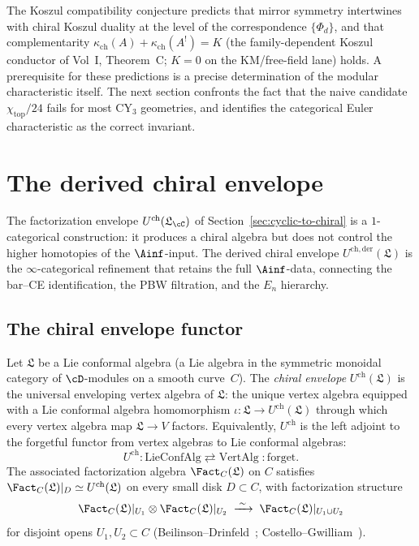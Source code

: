 The Koszul compatibility conjecture predicts that mirror symmetry intertwines with chiral Koszul duality at the level of the correspondence $\{\Phi_d\}$, and that complementarity $\kappa_{\mathrm{ch}}(A) + \kappa_{\mathrm{ch}}(A^!) = K$ (the family-dependent Koszul conductor of Vol~I, Theorem~C; $K = 0$ on the KM/free-field lane) holds. A prerequisite for these predictions is a precise determination of the modular characteristic itself. The next section confronts the fact that the naive candidate $\chi_{\mathrm{top}}/24$ fails for most CY$_3$ geometries, and identifies the categorical Euler characteristic as the correct invariant.

\section{The derived chiral envelope}
\label{sec:derived-chiral-envelope}

The factorization envelope $U^{\mathrm{ch}}(\mathfrak{L}_\cC)$ of Section~\ref{sec:cyclic-to-chiral} is a $1$-categorical construction: it produces a chiral algebra but does not control the higher homotopies of the $\Ainf$-input. The derived chiral envelope $U^{\mathrm{ch,der}}(\mathfrak{L})$ is the $\infty$-categorical refinement that retains the full $\Ainf$-data, connecting the bar--CE identification, the PBW filtration, and the $E_n$ hierarchy.

\subsection{The chiral envelope functor}
\label{subsec:chiral-envelope-functor}

\begin{construction}
\label{constr:chiral-envelope}
Let $\mathfrak{L}$ be a Lie conformal algebra (a Lie algebra in the symmetric monoidal category of $\cD$-modules on a smooth curve~$C$). The \emph{chiral envelope} $U^{\mathrm{ch}}(\mathfrak{L})$ is the universal enveloping vertex algebra of $\mathfrak{L}$: the unique vertex algebra equipped with a Lie conformal algebra homomorphism $\iota \colon \mathfrak{L} \to U^{\mathrm{ch}}(\mathfrak{L})$ through which every vertex algebra map $\mathfrak{L} \to V$ factors. Equivalently, $U^{\mathrm{ch}}$ is the left adjoint to the forgetful functor from vertex algebras to Lie conformal algebras:
\[
 U^{\mathrm{ch}} \colon \mathrm{LieConfAlg} \rightleftarrows \mathrm{VertAlg} \;:\! \mathrm{forget}.
\]
The associated factorization algebra $\Fact_C(\mathfrak{L})$ on $C$ satisfies $\Fact_C(\mathfrak{L})|_D \simeq U^{\mathrm{ch}}(\mathfrak{L})$ on every small disk $D \subset C$, with factorization structure
\[
 \Fact_C(\mathfrak{L})|_{U_1} \otimes \Fact_C(\mathfrak{L})|_{U_2}
 \;\xrightarrow{\;\sim\;}\;
 \Fact_C(\mathfrak{L})|_{U_1 \cup U_2}
\]
for disjoint opens $U_1, U_2 \subset C$ (Beilinson--Drinfeld~\cite{BeilinsonDrinfeld}; Costello--Gwilliam~\cite{CostelloGwilliam}).
\end{construction}

